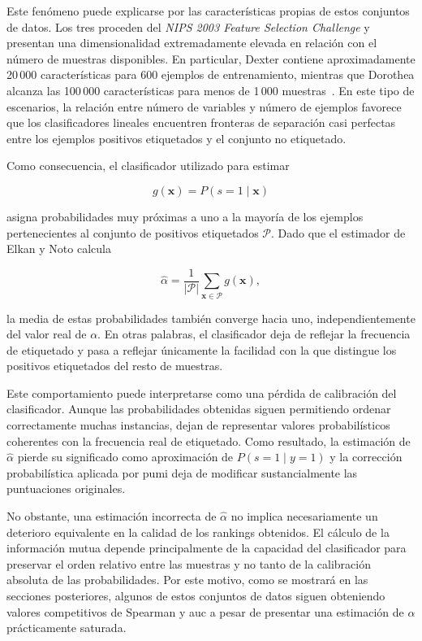 Este fenómeno puede explicarse por las características propias de estos conjuntos de datos. Los tres proceden del \textit{NIPS 2003 Feature Selection Challenge} y presentan una dimensionalidad extremadamente elevada en relación con el número de muestras disponibles. En particular, Dexter contiene aproximadamente 20\,000 características para 600 ejemplos de entrenamiento, mientras que Dorothea alcanza las 100\,000 características para menos de 1\,000 muestras~\cite{guyon2004result}. En este tipo de escenarios, la relación entre número de variables y número de ejemplos favorece que los clasificadores lineales encuentren fronteras de separación casi perfectas entre los ejemplos positivos etiquetados y el conjunto no etiquetado.

Como consecuencia, el clasificador utilizado para estimar

\[
g(\mathbf{x}) = P(s=1 \mid \mathbf{x})
\]

asigna probabilidades muy próximas a uno a la mayoría de los ejemplos pertenecientes al conjunto de positivos etiquetados $\mathcal{P}$. Dado que el estimador de Elkan y Noto calcula

\[
\hat{\alpha}
=
\frac{1}{|\mathcal{P}|}
\sum_{\mathbf{x}\in\mathcal{P}}
g(\mathbf{x}),
\]

la media de estas probabilidades también converge hacia uno, independientemente del valor real de $\alpha$. En otras palabras, el clasificador deja de reflejar la frecuencia de etiquetado y pasa a reflejar únicamente la facilidad con la que distingue los positivos etiquetados del resto de muestras.

Este comportamiento puede interpretarse como una pérdida de calibración del clasificador. Aunque las probabilidades obtenidas siguen permitiendo ordenar correctamente muchas instancias, dejan de representar valores probabilísticos coherentes con la frecuencia real de etiquetado. Como resultado, la estimación de $\hat{\alpha}$ pierde su significado como aproximación de $P(s=1\mid y=1)$ y la corrección probabilística aplicada por \acrshort{pumi} deja de modificar sustancialmente las puntuaciones originales.

No obstante, una estimación incorrecta de $\hat{\alpha}$ no implica necesariamente un deterioro equivalente en la calidad de los rankings obtenidos. El cálculo de la información mutua depende principalmente de la capacidad del clasificador para preservar el orden relativo entre las muestras y no tanto de la calibración absoluta de las probabilidades. Por este motivo, como se mostrará en las secciones posteriores, algunos de estos conjuntos de datos siguen obteniendo valores competitivos de Spearman y \acrshort{auc} a pesar de presentar una estimación de $\alpha$ prácticamente saturada.

